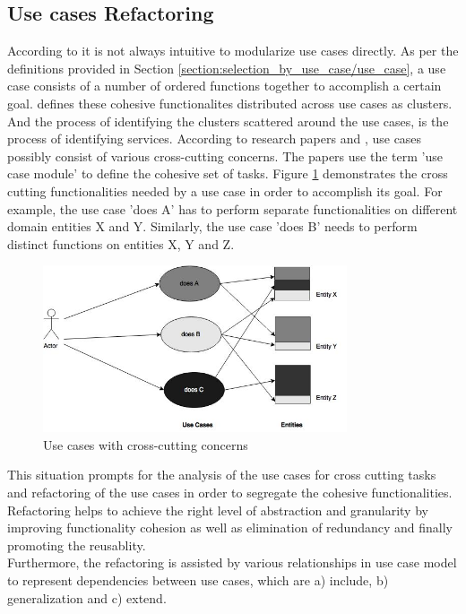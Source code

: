 \subsection{Use cases Refactoring}\label{section:selection_by_use_case/use_case_refactoring}
According to \cite{Jacobson:1987aa} it is not always intuitive to modularize use cases directly. As per the definitions provided in Section \ref{section:selection_by_use_case/use_case}, a use case consists of a number of ordered functions together to accomplish a certain goal. \cite{Jacobson:1987aa} defines these cohesive functionalites distributed across use cases as clusters. And the process of identifying the clusters scattered around the use cases, is the process of identifying services. According to research papers \cite{Ng:2004aa} and \cite{Jacobson:2003aa}, use cases possibly consist of various cross-cutting concerns. The papers use the term 'use case module' to define the cohesive set of tasks. Figure \ref{fig:selection_by_use_case/use_case_one} demonstrates the cross cutting functionalities needed by a use case in order to accomplish its goal. For example, the use case 'does A' has to perform separate functionalities on different domain entities X and Y. Similarly, the use case 'does B' needs to perform distinct functions on entities X, Y and Z.
\begin{figure}[H]
\begin{center}
\includegraphics[width=0.8\textwidth]{figures/use-case-one}
\caption{Use cases with cross-cutting concerns \cite{Ng:2004aa}}
\label{fig:selection_by_use_case/use_case_one}
\end{center}
\end{figure}
This situation prompts for the analysis of the use cases for cross cutting tasks and refactoring of the use cases in order to segregate the cohesive functionalities. Refactoring helps to achieve the right level of abstraction and granularity by improving functionality cohesion as well as elimination of redundancy and finally promoting the reusablity. \cite{Doh:2007aa}
\\
Furthermore, the refactoring is assisted by various relationships in use case model to represent dependencies between use cases, which are a) include, b) generalization and c) extend. \cite{Ng:2004aa}
\\
